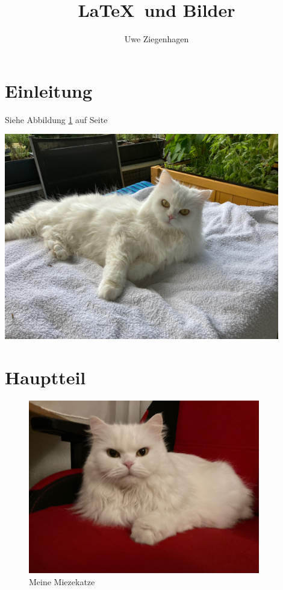 \documentclass[12pt,ngerman,parskip=half]{scrartcl}
\author{Uwe Ziegenhagen}
\title{\LaTeX\ und Bilder}
\begin{document}
\maketitle

\tableofcontents

\listoffigures


\section{Einleitung}

Siehe Abbildung \ref{fig:katze} auf Seite \pageref{fig:katze}

\blindtext[2]

\includegraphics[width=12cm]{Bilder/Katze1}

\blindtext[2]

\section{Hauptteil}\label{sec:hauptteil}

\blindtext[2]


\begin{figure}[h]
\begin{center}
\includegraphics[width=0.9\textwidth]{Bilder/Katze}
\caption{Meine Miezekatze}\label{fig:katze}
\end{center}
\end{figure}
\end{document}

